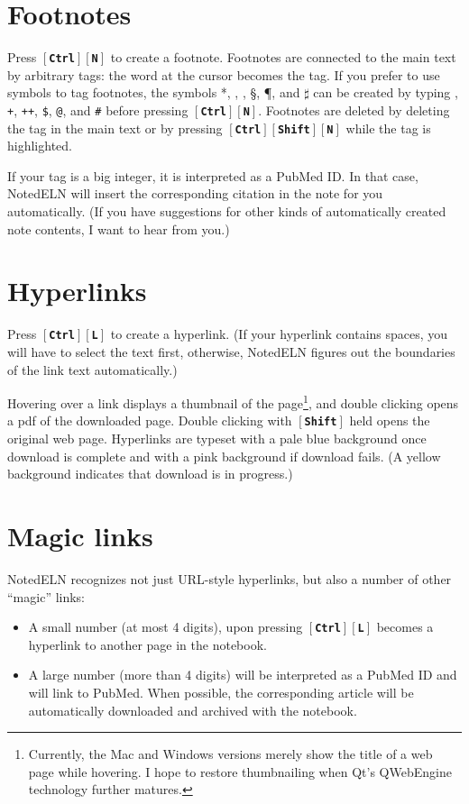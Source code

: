 \documentclass[11pt]{report}
\def\keystroke#1{$\left[\right.\!${\tt\bfseries #1}$\!\left.\right]$}
\def\key#1{\keystroke{#1}}
\def\keycombo#1#2{\keystroke{#1}\keystroke{#2}}
\def\keycontrol#1{\keycombo{Ctrl}{#1}}
\def\controlshift#1{\keystroke{Ctrl}\keystroke{Shift}\keystroke{#1}}
\begin{document}
\section{Footnotes}

Press \keycontrol{N} to create a footnote. Footnotes are connected to
the main text by arbitrary tags: the word at the cursor becomes the
tag.  If you prefer to use symbols to tag footnotes, the symbols *,
\dag, \ddag, \S, \P, and $\sharp$ can be created by typing {\tt *},
    {\tt +}, {\tt ++}, {\tt\$}, {\tt @}, and {\tt \#} before pressing
    \keycontrol{N}. Footnotes are deleted by deleting the tag in the
    main text or by pressing \controlshift{N} while the tag is
    highlighted.

If your tag is a big integer, it is interpreted as a PubMed ID. In
that case, NotedELN will insert the corresponding citation in the note for
you automatically. (If you have suggestions for other kinds of
automatically created note contents, I want to hear from you.)

\section{Hyperlinks}

Press \keycontrol{L} to create a hyperlink. (If your hyperlink
contains spaces, you will have to select the text first, otherwise,
NotedELN figures out the boundaries of the link text automatically.)

Hovering over a link displays a thumbnail of the
page\footnote{Currently, the Mac and Windows versions merely show the
  title of a web page while hovering. I hope to restore thumbnailing
  when Qt's QWebEngine technology further matures.}, and double
clicking opens a pdf of the downloaded page. Double clicking with
\key{Shift} held opens the original web page. Hyperlinks are typeset
with a pale blue background once download is complete and with a pink
background if download fails. (A yellow background indicates that
download is in progress.)

\section{Magic links}

NotedELN recognizes not just URL-style hyperlinks, but also a number of
other ``magic'' links:
\begin{itemize}
\item A small number (at most 4 digits), upon pressing \keycontrol{L}
becomes a hyperlink to another page in the notebook.
\item A large number (more than 4 digits)
will be interpreted as a PubMed ID and will link to PubMed. When
possible, the corresponding article will be automatically downloaded
and archived with the notebook. 
\end{itemize}
\end{document}
